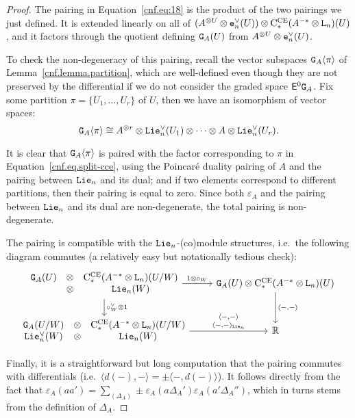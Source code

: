 \begin{proof}
  The pairing in Equation~\eqref{cnf.eq:18} is the product of the two pairings we just defined.
  It is extended linearly on all of $(A^{\otimes U} \otimes \mathtt{e}_{n}^{\vee}(U)) \otimes \mathrm{C}_{*}^{\mathrm{CE}}(A^{-*} \otimes \mathtt{L}_{n})(U)$, and it factors through the quotient defining $\mathtt{G}_{A}(U)$ from $A^{\otimes U} \otimes \mathtt{e}_{n}^{\vee}(U)$.

  To check the non-degeneracy of this pairing, recall the vector subspaces $\mathtt{G}_{A}\langle \pi \rangle$ of Lemma~\ref{cnf.lemma.partition}, which are well-defined even though they are not preserved by the differential if we do not consider the graded space $\mathsf{E}^{0} \mathtt{G}_{A}$.
  Fix some partition $\pi = \{ U_{1}, \dots, U_{r} \}$ of $U$, then we have an isomorphism of vector spaces:
  \[ \mathtt{G}_{A} \langle \pi \rangle \cong A^{\otimes r} \otimes \mathtt{Lie}_{n}^{\vee}(U_{1}) \otimes \dots \otimes A \otimes \mathtt{Lie}_{n}^{\vee}(U_{r}).
  \]

  It is clear that $\mathtt{G}_{A}\langle \pi \rangle$ is paired with the factor corresponding to $\pi$ in Equation~\eqref{cnf.eq.split-cce}, using the Poincaré duality pairing of $A$ and the pairing between $\mathtt{Lie}_{n}$ and its dual; and if two elements correspond to different partitions, then their pairing is equal to zero.
  Since both $\varepsilon_{A}$ and the pairing between $\mathtt{Lie}_{n}$ and its dual are non-degenerate, the total pairing is non-degenerate.

  The pairing is compatible with the $\mathtt{Lie}_{n}$-(co)module structures, i.e.\ the following diagram commutes (a relatively easy but notationally tedious check):
  \[ \begin{tikzcd}[ampersand replacement=\&]
      \begin{matrix}
        \GG{A}(U) & \otimes & \CCE(A^{-*} \otimes \Ln)(U/W) \\
        & \otimes & \Lie_{n}(W)
      \end{matrix}
      \rar{1 \otimes \circ_{W}} \dar{\circ_{W}^{\vee} \otimes 1}
      \& \GG{A}(U) \otimes \CCE(A^{-*} \otimes \Ln)(U) \dar{\langle -, -\rangle} \\
      \begin{matrix}
        \GG{A}(U/W) & \otimes & \CCE(A^{-*} \otimes \Ln)(U/W) \\
        \Lie_{n}^{\vee}(W) & \otimes & \Lie_{n}(W)
      \end{matrix}
      \rar{%
        \begin{smallmatrix}
          \langle -, -\rangle \\ \langle -, -\rangle_{\Lie_{n}}
        \end{smallmatrix}%
      }
      \& \R
    \end{tikzcd} \]

  Finally, it is a straightforward but long computation that the pairing commutes with differentials (i.e.\ $\langle d(-), - \rangle = \pm \langle -, d(-) \rangle$).
  It follows directly from the fact that $\varepsilon_{A}(aa') = \sum_{(\Delta_{A})} \pm \varepsilon_{A}(a \Delta_{A}') \varepsilon_{A}(a' \Delta_{A}'')$, which in turns stems from the definition of $\Delta_{A}$.
\end{proof}

